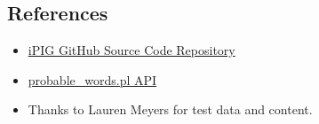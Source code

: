 \documentclass[12pt,notitlepage]{article}
\begin{document}
\begin{s5presentation}
\begin{ifhtml}
    \begin{s5slide}
      \section{References}
      \begin{itemize}
      \item \href{http://github.com/r351574nc3/Interdisciplinary-Practical-in-Genomics}{iPIG GitHub Source Code Repository}
      \item \href{http://www.u.arizona.edu/~przybyls/probable_words.html}{probable_words.pl API}
      \item Thanks to Lauren Meyers for test data and content.
      \end{itemize}
    \end{s5slide}

\end{ifhtml}  

  \W \end{s5presentation}
\end{document}
